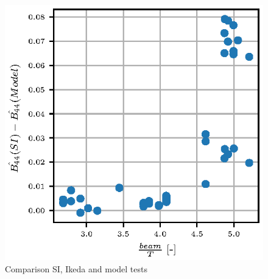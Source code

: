 \begin{figure}[H]
    \centering
    \includegraphics[]{figures/beam_T_residual.eps}
        \vspace{-0.5cm}
    \caption{Comparison SI, Ikeda and model tests}
    \label{fig:si_ikeda_model}
\end{figure}
